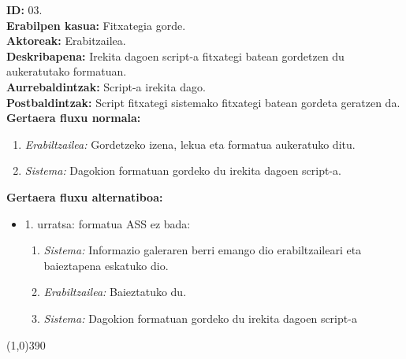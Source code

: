 \noindent
\textbf{ID:} 03.\\
\textbf{Erabilpen kasua:} Fitxategia gorde.\\
\textbf{Aktoreak:} Erabitzailea.\\
\textbf{Deskribapena:} Irekita dagoen script-a fitxategi batean gordetzen du aukeratutako formatuan.\\
\textbf{Aurrebaldintzak:} Script-a irekita dago.\\
\textbf{Postbaldintzak:} Script fitxategi sistemako fitxategi batean gordeta geratzen da.\\
\textbf{Gertaera fluxu normala:}
\begin{enumerate}
	\item \textit{Erabiltzailea:} Gordetzeko izena, lekua eta formatua aukeratuko ditu.
	\item \textit{Sistema:} Dagokion formatuan gordeko du irekita dagoen script-a.
\end{enumerate}
\textbf{Gertaera fluxu alternatiboa:}
\begin{itemize}
	\item 1. urratsa: formatua ASS ez bada:
		\begin{enumerate}
		\item \textit{Sistema:} Informazio galeraren berri emango dio erabiltzaileari eta baieztapena eskatuko dio.
		\item \textit{Erabiltzailea:} Baieztatuko du.
		\item \textit{Sistema:} Dagokion formatuan gordeko du irekita dagoen script-a
		\end{enumerate}
\end{itemize}
\line(1,0){390}

